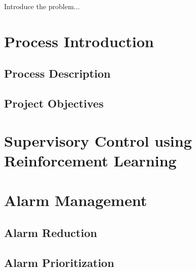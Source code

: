 Introduce the problem...

\section{Process Introduction}

\subsection{Process Description}
\subsection{Project Objectives}

\section{Supervisory Control using Reinforcement Learning}

\section{Alarm Management}

\subsection{Alarm Reduction}
\subsection{Alarm Prioritization}
